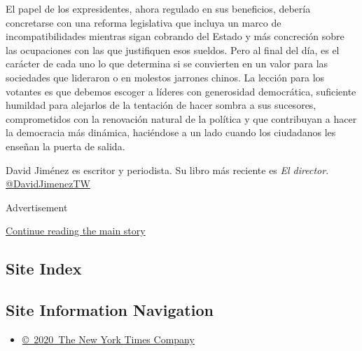 El papel de los expresidentes, ahora regulado en sus beneficios, debería
concretarse con una reforma legislativa que incluya un marco de
incompatibilidades mientras sigan cobrando del Estado y más concreción
sobre las ocupaciones con las que justifiquen esos sueldos. Pero al
final del día, es el carácter de cada uno lo que determina si se
convierten en un valor para las sociedades que lideraron o en molestos
jarrones chinos. La lección para los votantes es que debemos escoger a
líderes con generosidad democrática, suficiente humildad para alejarlos
de la tentación de hacer sombra a sus sucesores, comprometidos con la
renovación natural de la política y que contribuyan a hacer la
democracia más dinámica, haciéndose a un lado cuando los ciudadanos les
enseñan la puerta de salida.

David Jiménez es escritor y periodista. Su libro más reciente es
\emph{El director}.
\href{https://twitter.com/DavidJimenezTW}{@DavidJimenezTW}

Advertisement

\protect\hyperlink{after-bottom}{Continue reading the main story}

\hypertarget{site-index}{%
\subsection{Site Index}\label{site-index}}

\hypertarget{site-information-navigation}{%
\subsection{Site Information
Navigation}\label{site-information-navigation}}

\begin{itemize}
\tightlist
\item
  \href{https://help.nytimes.com/hc/en-us/articles/115014792127-Copyright-notice}{©~2020~The
  New York Times Company}
\end{itemize}

